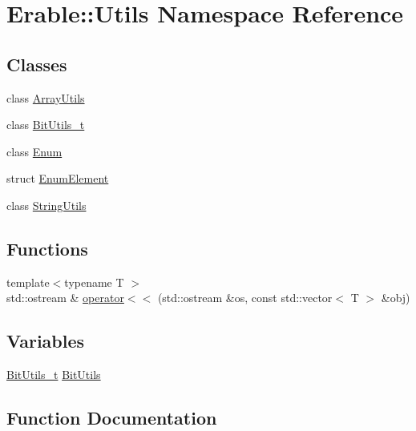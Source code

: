 \hypertarget{namespace_erable_1_1_utils}{}\section{Erable\+::Utils Namespace Reference}
\label{namespace_erable_1_1_utils}
\subsection*{Classes}
\begin{DoxyCompactItemize}
\item 
class \mbox{\hyperlink{class_erable_1_1_utils_1_1_array_utils}{Array\+Utils}}
\item 
class \mbox{\hyperlink{class_erable_1_1_utils_1_1_bit_utils__t}{Bit\+Utils\+\_\+t}}
\item 
class \mbox{\hyperlink{class_erable_1_1_utils_1_1_enum}{Enum}}
\item 
struct \mbox{\hyperlink{struct_erable_1_1_utils_1_1_enum_element}{Enum\+Element}}
\item 
class \mbox{\hyperlink{class_erable_1_1_utils_1_1_string_utils}{String\+Utils}}
\end{DoxyCompactItemize}
\subsection*{Functions}
\begin{DoxyCompactItemize}
\item 
{\footnotesize template$<$typename T $>$ }\\std\+::ostream \& \mbox{\hyperlink{namespace_erable_1_1_utils_a6dc77687b5aeb805242f0892e4cc72fa}{operator$<$$<$}} (std\+::ostream \&os, const std\+::vector$<$ T $>$ \&obj)
\end{DoxyCompactItemize}
\subsection*{Variables}
\begin{DoxyCompactItemize}
\item 
\mbox{\hyperlink{class_erable_1_1_utils_1_1_bit_utils__t}{Bit\+Utils\+\_\+t}} \mbox{\hyperlink{namespace_erable_1_1_utils_a727a49112d12a43019e05cb2fde93855}{Bit\+Utils}}
\end{DoxyCompactItemize}


\subsection{Function Documentation}
\mbox{\label{namespace_erable_1_1_utils_a6dc77687b5aeb805242f0892e4cc72fa}} 
